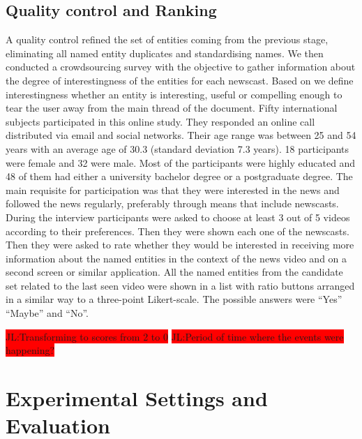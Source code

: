 \documentclass{llncs}
\newcommand{\todo}[1]{\colorbox{red}{#1}}
\begin{document}
\subsection{Quality control and Ranking}
A quality control refined the set of entities coming from the previous stage, eliminating all named entity duplicates and standardising names. 
We then conducted a crowdsourcing survey with the objective to gather information about the degree of interestingness of the entities for each newscast. Based on \cite{vonBrzeski:2007:LCU:1321440.1321537} we define interestingness whether an entity is interesting, useful or compelling enough to tear the user away from the main thread of the document. Fifty international subjects participated in this online study. They responded an online call distributed via email and social networks. Their age range was between 25 and 54 years with an average age of 30.3 (standard deviation 7.3 years). 18 participants were female and 32 were male. Most of the participants were highly educated and 48 of them had either a university bachelor degree or a postgraduate degree. The main requisite for participation was that they were interested in the news and followed the news regularly, preferably through means that include newscasts.
During the interview participants were asked to choose at least 3 out of 5 videos according to their preferences. Then they were shown each one of the newscasts. Then they were asked to rate whether they would be interested in receiving more information about the named entities in the context of the news video and on a second screen or similar application. All the named entities from the candidate set related to the last seen video were shown in a list with ratio buttons arranged in a similar way to a three-point Likert-scale. The possible answers were ``Yes'' ``Maybe'' and ``No''. 

\todo{JL:Transforming to scores from 2 to 0}
\todo{JL:Period of time where the events were happening?}

\section{Experimental Settings and Evaluation}
\label{sec:Evaluation}
\end{document}
